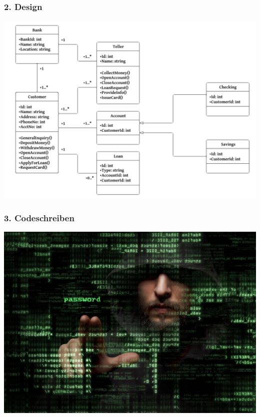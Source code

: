 \documentclass{beamer}
\begin{document}
\begin{frame}
    \frametitle{2. Design}
    \centering
    \includegraphics[width=\textwidth]{img/uml.png}
\end{frame}

\begin{frame}
    \frametitle{3. Codeschreiben}
    \centering
    \includegraphics[width=\textwidth]{img/coding.jpg}
\end{frame}
\end{document}
